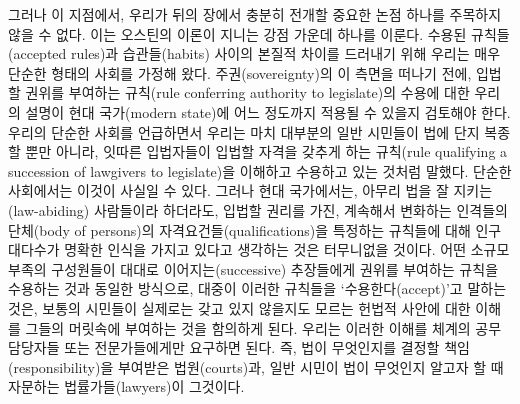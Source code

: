 그러나 이 지점에서, 우리가 뒤의 장에서 충분히 전개할 중요한 논점 하나를
주목하지 않을 수 없다. 이는 오스틴의 이론이 지니는 강점 가운데 하나를
이룬다. 수용된 규칙들(accepted rules)과 습관들(habits) 사이의 본질적
차이를 드러내기 위해 우리는 매우 단순한 형태의 사회를 가정해 왔다.
주권(sovereignty)의 이 측면을 떠나기 전에, 입법할 권위를 부여하는
규칙(rule conferring authority to legislate)의 수용에 대한 우리의 설명이
현대 국가(modern state)에 어느 정도까지 적용될 수 있을지 검토해야 한다.
우리의 단순한 사회를 언급하면서 우리는 마치 대부분의 일반 시민들이 법에
단지 복종할 뿐만 아니라, 잇따른 입법자들이 입법할 자격을 갖추게 하는
규칙(rule qualifying a succession of lawgivers to legislate)을 이해하고
수용하고 있는 것처럼 말했다. 단순한 사회에서는 이것이 사실일 수 있다.
그러나 현대 국가에서는, 아무리 법을 잘 지키는(law-abiding) 사람들이라
하더라도, 입법할 권리를 가진, 계속해서 변화하는 인격들의 단체(body of
persons)의 자격요건들(qualifications)을 특정하는 규칙들에 대해 인구
대다수가 명확한 인식을 가지고 있다고 생각하는 것은 터무니없을 것이다.
어떤 소규모 부족의 구성원들이 대대로 이어지는(successive) 추장들에게
권위를 부여하는 규칙을 수용하는 것과 동일한 방식으로, 대중이 이러한
규칙들을 ‘수용한다(accept)’고 말하는 것은, 보통의 시민들이 실제로는 갖고
있지 않을지도 모르는 헌법적 사안에 대한 이해를 그들의 머릿속에 부여하는
것을 함의하게 된다. 우리는 이러한 이해를 체계의 공무담당자들 또는
전문가들에게만 요구하면 된다. 즉, 법이 무엇인지를 결정할
책임(responsibility)을 부여받은 법원(courts)과, 일반 시민이 법이
무엇인지 알고자 할 때 자문하는 법률가들(lawyers)이 그것이다.

